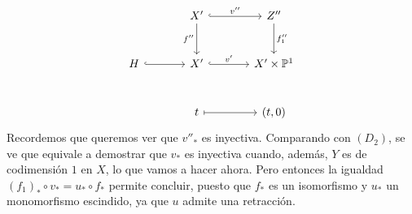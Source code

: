 \[
\begin{tikzcd}[column sep=large,row sep=large]
&X'\arrow[r,hook,"v''"]\arrow[d,"f''"']&Z''\arrow[d,"f''_1"]\\
H\arrow[r,hook]&X'\arrow[r,hook,"v'"]&X'\times\mathbb P^1\\
&t\arrow[r,mapsto]&{(t,0)}
\end{tikzcd}
\]
Recordemos que queremos ver que $v''_*$ es inyectiva. Comparando con $(D_2)$, se ve que equivale a demostrar que $v_*$ es inyectiva cuando, además, $Y$ es de codimensión $1$ en $X$, lo que vamos a hacer ahora. Pero entonces la igualdad $(f_1)_*\circ v_*=u_*\circ f_*$ permite concluir, puesto que $f_*$ es un isomorfismo y $u_*$ un monomorfismo escindido, ya que $u$ admite una retracción.
